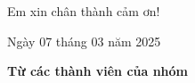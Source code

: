 \documentclass[main.tex]{subfiles}
\begin{document}




\vspace{6pt}
\begin{flushright} Em xin chân thành cảm ơn! \end{flushright}

\hspace{12cm}Ngày 07 tháng 03 năm 2025

\vspace{2cm}

\hspace{12.25cm}\textbf{Từ các thành viên của nhóm}
\end{document}
